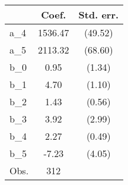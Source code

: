 {
\def\sym#1{\ifmmode^{#1}\else\(^{#1}\)\fi}
\begin{tabular}{l*{1}{cc}}
\hline\hline
                &    Coef.&Std. err.\\
\hline
a\_4             &  1536.47&  (49.52)\\
a\_5             &  2113.32&  (68.60)\\
b\_0             &     0.95&   (1.34)\\
b\_1             &     4.70&   (1.10)\\
b\_2             &     1.43&   (0.56)\\
b\_3             &     3.92&   (2.99)\\
b\_4             &     2.27&   (0.49)\\
b\_5             &    -7.23&   (4.05)\\
\hline
Obs.            &      312&         \\
\hline\hline
\end{tabular}
}
